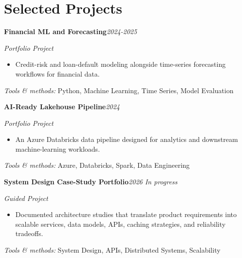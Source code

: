\documentclass[9pt,letterpaper]{extarticle}
\newcommand{\entry}[2]{\Needspace{4\baselineskip}\textbf{#1}\hfill\textit{#2}\par}
\begin{document}
\section{Selected Projects}
\entry{Financial ML and Forecasting}{2024-2025}
\textit{Portfolio Project}\par
\begin{itemize}
\item Credit-risk and loan-default modeling alongside time-series forecasting workflows for financial data.
\end{itemize}
{\small\textit{Tools \& methods:} Python, Machine Learning, Time Series, Model Evaluation\par}
\entry{AI-Ready Lakehouse Pipeline}{2024}
\textit{Portfolio Project}\par
\begin{itemize}
\item An Azure Databricks data pipeline designed for analytics and downstream machine-learning workloads.
\end{itemize}
{\small\textit{Tools \& methods:} Azure, Databricks, Spark, Data Engineering\par}
\entry{System Design Case-Study Portfolio}{2026 \textbar{} In progress}
\textit{Guided Project}\par
\begin{itemize}
\item Documented architecture studies that translate product requirements into scalable services, data models, APIs, caching strategies, and reliability tradeoffs.
\end{itemize}
{\small\textit{Tools \& methods:} System Design, APIs, Distributed Systems, Scalability\par}
\end{document}
